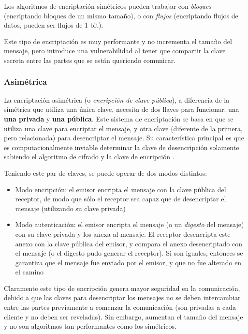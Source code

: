 Los algoritmos de encriptación simétricos pueden trabajar con \emph{bloques} (encriptando bloques de un mismo tamaño), o con \emph{flujos} (encriptando flujos de datos, pueden ser flujos de 1 bit).  

Este tipo de encriptación es muy performante y no incrementa el tamaño del mensaje, pero introduce una vulnerabilidad al tener que compartir la clave secreta entre las partes que se están queriendo comunicar.

\subsubsection{Asimétrica}

La encriptación asimétrica (o \emph{encripción de clave pública}), a diferencia de la simétrica que utiliza una única clave, necesita de dos llaves para funcionar: una \textbf{una privada} y \textbf{una pública}.  
Este sistema de encriptación se basa en que se utiliza una clave para encriptar el mensaje, y otra clave (diferente de la primera, pero relacionada) para desencriptar el mensaje. Su característica principal es que es computacionalmente inviable determinar la clave de desencripción solamente sabiendo el algoritmo de cifrado y la clave de encripción \autocite{StallingsPublicKeyPrinciples}.

Teniendo este par de claves, se puede operar de dos modos distintos:

\begin{itemize}
    \item Modo encripción: el emisor encripta el mensaje con la clave pública del receptor, de modo que sólo el receptor sea capaz que de desencriptar el mensaje (utilizando su clave privada)
    \item Modo autenticación: el emisor encripta el mensaje (o un \emph{digesto} del mensaje) con su clave privada y los anexa al mensaje. El receptor desencripta este anexo con la clave pública del emisor, y compara el anexo desencriptado con el mensaje (o el digesto pudo generar el receptor). Si son iguales, entonces se garantiza que el mensaje fue enviado por el emisor, y que no fue alterado en el camino
\end{itemize}

Claramente este tipo de encripción genera mayor seguridad en la comunicación, debido a que las claves para desencriptar los mensajes no se deben intercambiar entre las partes previamente a comenzar la comunicación (son privadas a cada cliente y no deben ser reveladas). Sin embargo, aumentan el tamaño del mensaje y no son algoritmos tan performantes como los simétricos.

